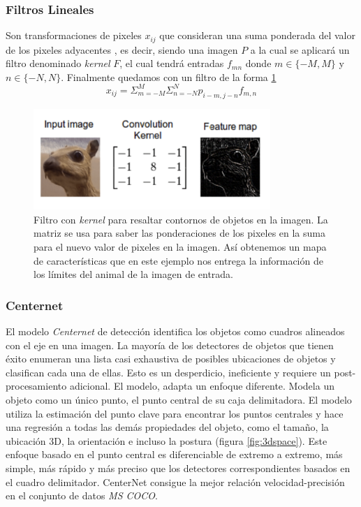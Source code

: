 \documentclass[letter,12pt]{report}
\begin{document}
\subsubsection{Filtros Lineales}
Son transformaciones de pixeles $x_{ij}$ que consideran una suma ponderada del valor de
los pixeles adyacentes \cite{Conv}, es decir, siendo una imagen $P$ a la cual se  aplicará
un filtro denominado \textit{kernel} $F$, el cual tendrá entradas $f_{mn}$ donde
$m\in\{-M,M\}$ y $n\in\{-N,N\}$. Finalmente quedamos con un filtro de la forma
\ref{fig:kernel}
$$x_{ij}=\Sigma_{m=-M}^M\Sigma_{n=-N}^Np_{i-m,j-n}f_{m,n}$$

\begin{figure}[H]
    \centering
    \includegraphics[width=0.8\textwidth]{kernel}
    \caption{Filtro con \textit{kernel} para resaltar contornos de objetos en la imagen.
        La matriz se usa para saber las ponderaciones de los pixeles en la suma para el nuevo
        valor de pixeles en la imagen. Así obtenemos un mapa de características que en este
    ejemplo nos entrega la información de los límites del animal de la imagen de entrada.}
    \label{fig:kernel}
\end{figure}

\subsubsection{Centernet}

El modelo \textit{Centernet} de detección identifica los objetos como cuadros alineados con el
eje en una imagen. La mayoría de los detectores de objetos que tienen éxito enumeran una lista
casi exhaustiva de posibles ubicaciones de objetos y clasifican cada una de ellas. Esto es un
desperdicio, ineficiente y requiere un post-procesamiento adicional. El modelo, adapta un 
enfoque diferente. Modela un objeto como un único punto, el punto central de su caja
delimitadora. El modelo utiliza la estimación del punto clave para encontrar los puntos 
centrales y hace una regresión a todas las demás propiedades del objeto, como el tamaño, la
ubicación 3D, la orientación e incluso la postura (figura \ref{fig:3dspace}). Este enfoque 
basado en el punto central es diferenciable de extremo a extremo, más simple, más rápido y más
preciso que los detectores correspondientes basados en el cuadro delimitador. CenterNet
consigue la mejor relación velocidad-precisión en el conjunto de datos \textit{MS COCO}.
\end{document}
